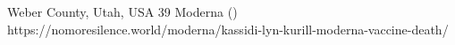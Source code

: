           {Weber County, Utah, USA}
          {39}
          {Moderna}
          {}
          {
             ()
          }
          {https://nomoresilence.world/moderna/kassidi-lyn-kurill-moderna-vaccine-death/}


